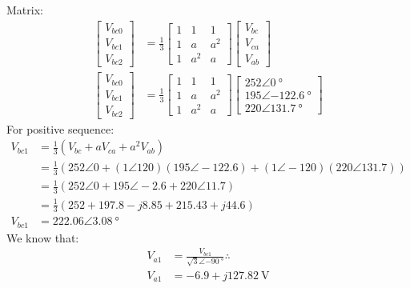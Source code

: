 Matrix:
\begin{align}
    \begin{bmatrix}
        V_{bc0} \\
        V_{bc1} \\
        V_{bc2}
    \end{bmatrix} &= \frac{1}{3}\begin{bmatrix}
        1 & 1   & 1   \\
        1 & a   & a^2   \\
        1 & a^2 & a
    \end{bmatrix}\begin{bmatrix}
        V_{bc}\\
        V_{ca}\\
        V_{ab}
    \end{bmatrix}\\
    \begin{bmatrix}
        V_{bc0} \\
        V_{bc1} \\
        V_{bc2}
    \end{bmatrix} &= \frac{1}{3}\begin{bmatrix}
        1 & 1   & 1   \\
        1 & a   & a^2   \\
        1 & a^2 & a
    \end{bmatrix}\begin{bmatrix}
        252\angle\SI{0}{\degree}     \\
        195\angle\SI{-122.6}{\degree} \\
        220\angle\SI{131.7}{\degree}
    \end{bmatrix}
\end{align}
For positive sequence:
\begin{align}
    V_{bc1} &= \frac{1}{3}\left(V_{bc}+aV_{ca}+a^2V_{ab}\right)\\
    &= \frac{1}{3}\left(252\angle 0 + \left(1\angle 120\right)\left(195\angle -122.6\right)+\left(1\angle -120\right)\left(220\angle 131.7\right)\right)\\
    &= \frac{1}{3}\left(252\angle 0 + 195\angle -2.6+220\angle 11.7\right)\\
    &= \frac{1}{3}\left(252 + 197.8 -j8.85 + 215.43+j44.6\right)\\
    V_{bc1} &= 222.06\angle \SI{3.08}{\degree}
\end{align}
We know that:
\begin{align}
    V_{a1} &= \frac{V_{bc1}}{\sqrt{3}\angle\SI{-90}{\degree}}\therefore \\
    V_{a1} &= -6.9+j\SI{127.82}{\volt}
\end{align}
